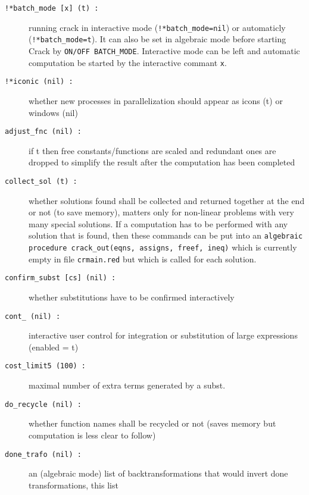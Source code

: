 \documentclass[12pt]{article}
\begin{document}
\begin{description}
\item[{\tt !*batch\_mode [x] (t) :}] running crack in interactive mode
                   ({\tt !*batch\_mode=nil}) or automaticly
                   ({\tt !*batch\_mode=t}). It can also be
                   set in algebraic mode before starting {\sc Crack}
                   by {\tt ON/OFF BATCH\_MODE}. Interactive mode can be left
                   and automatic computation be started by the interactive
                   commant {\tt x}.
\item[{\tt !*iconic (nil) :}] whether new processes in parallelization
                   should appear as icons (t) or windows (nil)
\item[{\tt adjust\_fnc (nil) :}] if t then free constants/functions
                    are scaled and redundant ones are dropped to
                    simplify the result after the computation has been
                    completed
\item[{\tt collect\_sol (t) :}] whether solutions found shall be collected and
                    returned together at the end or not (to save
                    memory), matters only for non-linear problems with
                    very many special solutions. If a computation has
                    to be performed with any solution that is found,
                    then these commands can be put into an
                    {\tt algebraic procedure crack\_out(eqns, assigns, freef, ineq)}
                    which is currently empty in file {\tt crmain.red}
                    but which is called for each solution.
\item[{\tt confirm\_subst [cs] (nil) :}] whether substitutions have to be
                   confirmed interactively
\item[{\tt cont\_ (nil) :}] interactive user control for integration
                   or substitution of large expressions (enabled = t)
\item[{\tt cost\_limit5 (100) :}] maximal number of extra terms
                    generated by a subst.
\item[{\tt do\_recycle (nil) :}] whether function names shall be recycled
                   or not (saves memory but computation is less clear to follow)
\item[{\tt done\_trafo (nil) :}] an (algebraic mode) list of backtransformations
                   that would invert done transformations, this list

\end{description}
\end{document}
